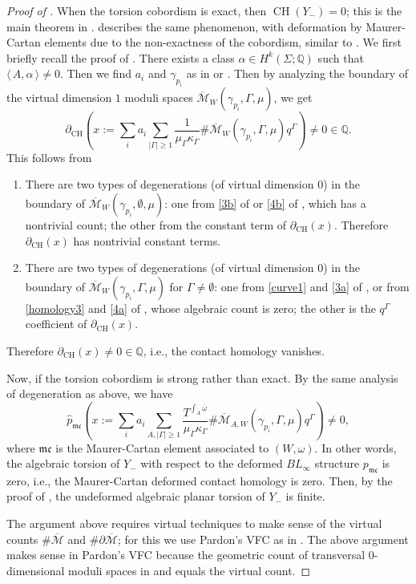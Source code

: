 \documentclass[11pt]{amsart}
\numberwithin{equation}{section}
\def\Q{{\mathbb Q}}
\def\cM{{\mathcal M}}
\def\mc{{\mathfrak {mc}}}
\def\la{\langle\,}
\def\ra{\,\rangle}
\DeclareMathOperator{\CH}{CH}
\begin{document}
\begin{proof}[Proof of ]
When the torsion cobordism is exact, then $\CH(Y_-)=0$; this is the main theorem in \cite{+1}.  describes the same phenomenon, with deformation by Maurer-Cartan elements due to the non-exactness of the cobordism, similar to \cite[Theorem 1.1]{moreno2024rsft}. We first briefly recall the proof of \cite[Theorem 1.1]{+1}. There exists a class $\alpha \in H^k(\Sigma;\Q)$ such that $\la A, \alpha \ra \ne 0$. Then we find $a_i$ and $\gamma_{p_i}$ as in  or . Then by analyzing the boundary of the virtual dimension $1$ moduli spaces $\overline{\cM}_W(\gamma_{p_i},\Gamma, \mu)$, we get 
$$\partial_{\CH} \left(x:=\sum_i a_i \sum_{|\Gamma|\ge 1} \frac{1}{\mu_{\Gamma}\kappa_{\Gamma}}\#\overline{\cM}_W(\gamma_{p_i},\Gamma, \mu)q^{\Gamma}\right)\ne 0 \in \Q. $$
This follows from 
\begin{enumerate}
    \item There are two types of degenerations (of virtual dimension $0$) in the boundary of $\overline{\cM}_W(\gamma_{p_i},\emptyset, \mu)$: one from \eqref{3b} of  or \eqref{4b} of , which has a nontrivial count; the other from the constant term of $\partial_{\CH}(x)$. Therefore $\partial_{\CH}(x)$ has nontrivial constant terms.
    \item There are two types of degenerations (of virtual dimension $0$) in the boundary of $\overline{\cM}_W(\gamma_{p_i},\Gamma, \mu)$ for $\Gamma \ne \emptyset$: one from \eqref{curve1} and \eqref{3a} of , or from \eqref{homology3} and \eqref{4a} of , whose algebraic count is zero; the other is the $q^{\Gamma}$ coefficient of $\partial_{\CH}(x)$.
\end{enumerate}
Therefore $\partial_{\CH}(x)\ne 0 \in \Q$, i.e., the contact homology vanishes. 

Now, if the torsion cobordism is strong rather than exact. By the same analysis of degeneration as above, we have 
$$\widehat{p}_{\mc} \left(x:=\sum_i a_i \sum_{A,|\Gamma|\ge 1} \frac{T^{\int_A \overline{\omega}}}{\mu_{\Gamma}\kappa_{\Gamma}}\#\overline{\cM}_{A,W}(\gamma_{p_i},\Gamma, \mu)q^{\Gamma}\right)\ne 0,$$ 
where $\mc$ is the Maurer-Cartan element associated to $(W,\omega)$. In other words, the algebraic torsion of $Y_-$ with respect to the deformed $BL_\infty$ structure $p_{\mc}$ is zero, i.e., the Maurer-Cartan deformed contact homology is zero. Then, by the proof of \cite[Theorem 1.1]{moreno2024rsft}, the undeformed algebraic planar torsion of $Y_-$ is finite. 

The argument above requires virtual techniques to make sense of the virtual counts $\#\overline{\cM}$ and $\#\partial \overline{\cM}$; for this we use Pardon's VFC as in \cite{moreno2024landscape,moreno2024rsft}. The above argument makes sense in Pardon's VFC because the geometric count of transversal $0$-dimensional moduli spaces in  and  equals the virtual count. 
\end{proof}
\end{document}
